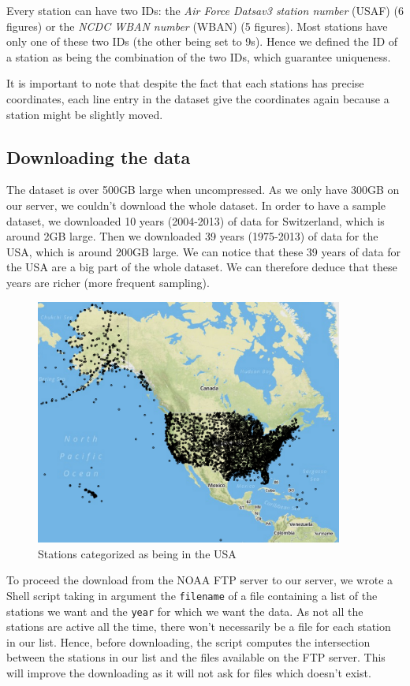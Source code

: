 Every station can have two IDs: the \emph{Air Force Datsav3 station number} (USAF) (6 figures) or the \emph{NCDC WBAN number} (WBAN) (5 figures). Most stations have only one of these two IDs (the other being set to 9s). Hence we defined the ID of a station as being the combination of the two IDs, which guarantee uniqueness.

It is important to note that despite the fact that each stations has precise coordinates, each line entry in the dataset give the coordinates again because a station might be slightly moved.

\subsection{Downloading the data}
The dataset is over 500GB large when uncompressed. As we only have 300GB on our server, we couldn't download the whole dataset. In order to have a sample dataset, we downloaded 10 years (2004-2013) of data for Switzerland, which is around 2GB large. Then we downloaded 39 years (1975-2013) of data for the USA, which is around 200GB large. We can notice that these 39 years of data for the USA are a big part of the whole dataset. We can therefore deduce that these years are richer (more frequent sampling).

\begin{figure}[htb]
	\centering
	\includegraphics[width=0.9\textwidth]{figures/USStations.png}
	\caption{Stations categorized as being in the USA}
\end{figure}

To proceed the download from the NOAA FTP server to our server, we wrote a Shell script taking in argument the \texttt{filename} of a file containing a list of the stations we want and the \texttt{year} for which we want the data. As not all the stations are active all the time, there won't necessarily be a file for each station in our list. Hence, before downloading, the script computes the intersection between the stations in our list and the files available on the FTP server. This will improve the downloading as it will not ask for files which doesn't exist.